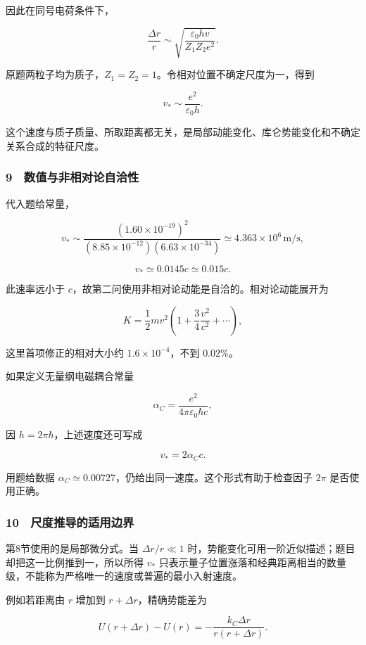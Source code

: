 \documentclass[12pt,a4paper,fontset=fandol]{ctexart}
\begin{document}
因此在同号电荷条件下，

\[\boxed{\frac{\Delta r}{r}
\sim\sqrt{\frac{\varepsilon_0hv}{Z_1Z_2e^2}}.}\]

原题两粒子均为质子，\(Z_1=Z_2=1\)。令相对位置不确定尺度为一，得到

\[\boxed{v_*\sim\frac{e^2}{\varepsilon_0h}.}\]

这个速度与质子质量、所取距离都无关，是局部动能变化、库仑势能变化和不确定关系合成的特征尺度。

\subsubsection{9　数值与非相对论自洽性}\label{ux6570ux503cux4e0eux975eux76f8ux5bf9ux8bbaux81eaux6d3dux6027}

代入题给常量，

\[v_*\sim\frac{(1.60\times10^{-19})^2}
{(8.85\times10^{-12})(6.63\times10^{-34})}
\simeq4.363\times10^6\,\mathrm{m/s},\]

\[\boxed{v_*\simeq0.0145c\simeq0.015c.}\]

此速率远小于 \(c\)，故第二问使用非相对论动能是自洽的。相对论动能展开为

\[K=\frac12mv^2\left(1+\frac34\frac{v^2}{c^2}+\cdots\right),\]

这里首项修正的相对大小约 \(1.6\times10^{-4}\)，不到 \(0.02\%\)。

如果定义无量纲电磁耦合常量

\[\alpha_C=\frac{e^2}{4\pi\varepsilon_0\hbar c},\]

因 \(h=2\pi\hbar\)，上述速度还可写成

\[\boxed{v_*=2\alpha_Cc.}\]

用题给数据
\(\alpha_C\simeq0.00727\)，仍给出同一速度。这个形式有助于检查因子
\(2\pi\) 是否使用正确。

\subsubsection{10　尺度推导的适用边界}\label{ux5c3aux5ea6ux63a8ux5bfcux7684ux9002ux7528ux8fb9ux754c}

第8节使用的是局部微分式。当 \(\Delta r/r\ll1\)
时，势能变化可用一阶近似描述；题目却把这一比例推到一，所以所得 \(v_*\)
只表示量子位置涨落和经典距离相当的数量级，不能称为严格唯一的速度或普遍的最小入射速度。

例如若距离由 \(r\) 增加到 \(r+\Delta r\)，精确势能差为

\[U(r+\Delta r)-U(r)
=-\frac{k_C\Delta r}{r(r+\Delta r)}.\]
\end{document}
